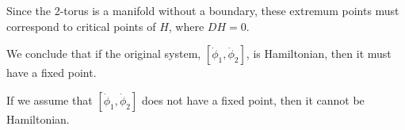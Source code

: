 \begin{solution}[8.3]
\begin{enumerate}
Since the 2-torus is a manifold without a boundary, these extremum points must correspond to critical points of $H$, where $DH = 0$. 

We conclude that if the original system, $[\dot{\phi}_1, \dot{\phi}_2]$, is Hamiltonian, then it must have a fixed point. 

If we assume that  $[\dot{\phi}_1, \dot{\phi}_2]$ does not have a fixed point, then it cannot be Hamiltonian. 
	\end{enumerate}
%
\end{solution}


